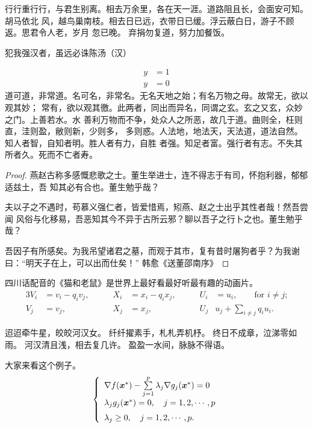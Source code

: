 行行重行行，与君生别离。相去万余里，各在天一涯。道路阻且长，会面安可知。胡马依北
风，越鸟巢南枝。相去日已远，衣带日已缓。浮云蔽白日，游子不顾返。思君令人老，岁月
忽已晚。  弃捐勿复道，努力加餐饭。

\begin{theorem}\label{the:theorem1}
犯我强汉者，虽远必诛\hfill \pozhehao 陈汤（汉）
\end{theorem}
\begin{subequations}
\begin{align}
y & = 1 \\
y & = 0
\end{align}
\end{subequations}
道可道，非常道。名可名，非常名。无名天地之始；有名万物之母。故常无，欲以观其妙；
常有，欲以观其徼。此两者，同出而异名，同谓之玄。玄之又玄，众妙之门。上善若水。水
善利万物而不争，处众人之所恶，故几于道。曲则全，枉则直，洼则盈，敝则新，少则多，
多则惑。人法地，地法天，天法道，道法自然。知人者智，自知者明。胜人者有力，自胜
者强。知足者富。强行者有志。不失其所者久。死而不亡者寿。

\begin{proof}
燕赵古称多感慨悲歌之士。董生举进士，连不得志于有司，怀抱利器，郁郁适兹土，吾
知其必有合也。董生勉乎哉？

夫以子之不遇时，苟慕义强仁者，皆爱惜焉，矧燕、赵之士出乎其性者哉！然吾尝闻
风俗与化移易，吾恶知其今不异于古所云邪？聊以吾子之行卜之也。董生勉乎哉？

吾因子有所感矣。为我吊望诸君之墓，而观于其市，复有昔时屠狗者乎？为我谢
曰：“明天子在上，可以出而仕矣！” \hfill\pozhehao 韩愈《送董邵南序》
\end{proof}

\begin{corollary}
  四川话配音的《猫和老鼠》是世界上最好看最好听最有趣的动画片。
\begin{alignat}{3}
V_i & =v_i - q_i v_j, & \qquad X_i & = x_i - q_i x_j,
 & \qquad U_i & = u_i,
 \qquad \text{for $i\ne j$;}\label{eq:B}\\
V_j & = v_j, & \qquad X_j & = x_j,
  & \qquad U_j & u_j + \sum_{i\ne j} q_i u_i.
\end{alignat}
\end{corollary}

迢迢牵牛星，皎皎河汉女。
纤纤擢素手，札札弄机杼。
终日不成章，泣涕零如雨。
河汉清且浅，相去复几许。
盈盈一水间，脉脉不得语。

\begin{example}
  大家来看这个例子。
\begin{equation}
\label{ktc}
\left\{\begin{array}{l}
\nabla f({\mbox{\boldmath $x$}}^*)-\sum\limits_{j=1}^p\lambda_j\nabla g_j({\mbox{\boldmath $x$}}^*)=0\\[0.3cm]
\lambda_jg_j({\mbox{\boldmath $x$}}^*)=0,\quad j=1,2,\cdots,p\\[0.2cm]
\lambda_j\ge 0,\quad j=1,2,\cdots,p.
\end{array}\right.
\end{equation}
\end{example}

